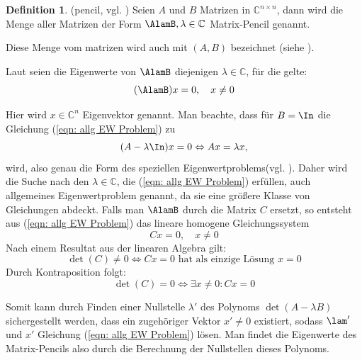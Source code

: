 \documentclass[a4paper,12pt]{report}
\newcommand{\C}{\mathbb C}
\newcommand{\zitat}[1]{\glqq #1\grqq}
\newcommand{\1}{\mathds{1}}
\theoremstyle{plain} %
\theoremstyle{definition} %
\newtheorem{definition}[theorem]{Definition}
\theoremstyle{remark}
\begin{document}
            \begin{definition}(pencil, vgl. \cite[S. 375]{matrixGolub})
                  \label{def: pencil}
                  Seien $A$ und $B$ Matrizen in $\C^{n\times n}$, dann wird die Menge aller Matrizen der Form
                  $\AlamB, \lambda \in \C$ Matrix-Pencil genannt.
            \end{definition}

            Diese Menge vom matrizen wird auch mit $(A, B)$ bezeichnet (siehe \cite[S. 37w]{regularMatrixPencil}).

            Laut \cite[S. 375]{matrixGolub} seien die Eigenwerte von $\AlamB$ diejenigen $\lambda \in\C$, für die gelte:
            \begin{equation}
                  \label{eqn: allg EW Problem}
                  (\AlamB)x=0,\quad x\ne 0
            \end{equation}
            
            Hier wird $x\in\C^n$ Eigenvektor genannt.
            Man beachte, dass für $B=\In$ die Gleichung (\ref{eqn: allg EW Problem}) zu
            $$(A-\lambda\In)x=0 \Leftrightarrow Ax = \lambda x,$$
            wird, also genau die Form des \zitat{speziellen Eigenwertproblems}(vgl. \cite[S. 381]{maschinendynamikDresig}).
            Daher wird die Suche nach den $\lambda\in\C$, die (\ref{eqn: allg EW Problem}) erfüllen, auch \zitat{allgemeines Eigenwertproblem}\cite[S. 380]{maschinendynamikDresig} genannt, da sie eine größere Klasse von Gleichungen abdeckt.
            Falls man $\AlamB$ durch die Matrix $C$ ersetzt, so entsteht aus (\ref{eqn: allg EW Problem}) das lineare homogene Gleichungssystem
            $$Cx=0,\quad x\ne 0$$
            Nach einem Resultat aus der linearen Algebra gilt:
            $$\det(C)\ne 0 \Leftrightarrow Cx=0 \text{ hat als einzige Lösung }x=0$$
            Durch Kontraposition folgt:
            $$\det(C)=0 \Leftrightarrow \exists x\ne 0: Cx=0$$

            
            Somit kann durch Finden einer Nullstelle $\lambda'$ des Polynoms $\det(A-\lambda B)$ sichergestellt werden, dass ein zugehöriger Vektor $x'\ne 0$ existiert, sodass $\lam'$ und $x'$ Gleichung (\ref{eqn: allg EW Problem}) lösen.
            Man findet die Eigenwerte des Matrix-Pencils also durch die Berechnung der Nullstellen dieses Polynoms.
\end{document}

